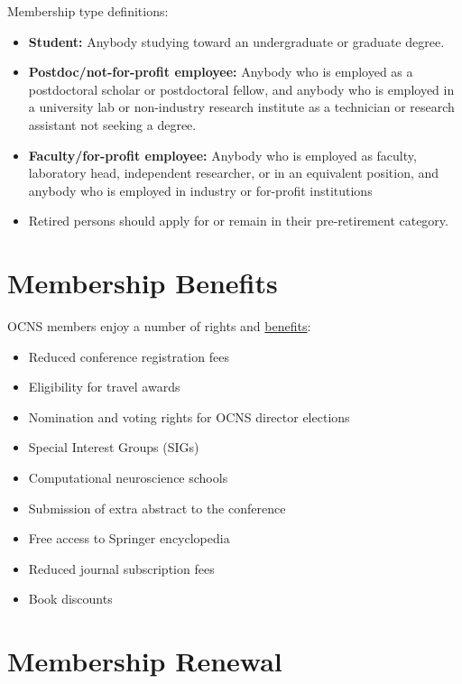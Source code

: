 \documentclass[11pt,a4paper,oneside]{article}
\begin{document}
Membership type definitions:
\begin{itemize}
  \item \textbf{Student:} Anybody studying toward an undergraduate or graduate degree.
  \item \textbf{Postdoc/not-for-profit employee:} Anybody who is employed as a postdoctoral scholar or postdoctoral fellow, and anybody who is employed in a university lab or non-industry research institute as a technician or research assistant not seeking a degree.
  \item \textbf{Faculty/for-profit employee:} Anybody who is employed as faculty, laboratory head, independent researcher, or in an equivalent position, and anybody who is employed in industry or for-profit institutions
  \item Retired persons should apply for or remain in their pre-retirement category.
\end{itemize}

\section*{Membership Benefits}%
\sectionauthor{\vspace{-4ex}}

OCNS members enjoy a number of rights and \href{https://www.cnsorg.org/member-benefits}{benefits}:
\begin{multicols}{2}
  \begin{itemize}
    \item Reduced conference registration fees
    \item Eligibility for travel awards
    \item Nomination and voting rights for OCNS director elections
    \item Special Interest Groups (SIGs)
    \item Computational neuroscience schools
    \item Submission of extra abstract to the conference
    \item Free access to Springer encyclopedia
    \item Reduced journal subscription fees
    \item Book discounts
  \end{itemize}
\end{multicols}

\section*{Membership Renewal}%
\sectionauthor{\vspace{-4ex}}
\end{document}
